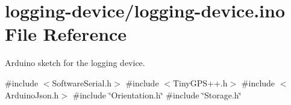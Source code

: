 \hypertarget{logging-device_8ino}{}\section{logging-\/device/logging-\/device.ino File Reference}
\label{logging-device_8ino}


Arduino sketch for the logging device.  


{\ttfamily \#include $<$Software\+Serial.\+h$>$}\newline
{\ttfamily \#include $<$Tiny\+G\+P\+S++.\+h$>$}\newline
{\ttfamily \#include $<$Arduino\+Json.\+h$>$}\newline
{\ttfamily \#include \char`\"{}Orientation.\+h\char`\"{}}\newline
{\ttfamily \#include \char`\"{}Storage.\+h\char`\"{}}\newline
